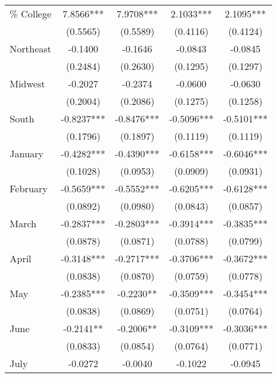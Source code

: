 \begin{table}[htbp]
\begin{tabular}{l*{4}{c}}
\% College          &      7.8566***&      7.9708***&      2.1033***&      2.1095***\\
                    &    (0.5565)   &    (0.5589)   &    (0.4116)   &    (0.4124)   \\
Northeast           &     -0.1400   &     -0.1646   &     -0.0843   &     -0.0845   \\
                    &    (0.2484)   &    (0.2630)   &    (0.1295)   &    (0.1297)   \\
Midwest             &     -0.2027   &     -0.2374   &     -0.0600   &     -0.0630   \\
                    &    (0.2004)   &    (0.2086)   &    (0.1275)   &    (0.1258)   \\
South               &     -0.8237***&     -0.8476***&     -0.5096***&     -0.5101***\\
                    &    (0.1796)   &    (0.1897)   &    (0.1119)   &    (0.1119)   \\
January             &     -0.4282***&     -0.4390***&     -0.6158***&     -0.6046***\\
                    &    (0.1028)   &    (0.0953)   &    (0.0909)   &    (0.0931)   \\
February            &     -0.5659***&     -0.5552***&     -0.6205***&     -0.6128***\\
                    &    (0.0892)   &    (0.0980)   &    (0.0843)   &    (0.0857)   \\
March               &     -0.2837***&     -0.2803***&     -0.3914***&     -0.3835***\\
                    &    (0.0878)   &    (0.0871)   &    (0.0788)   &    (0.0799)   \\
April               &     -0.3148***&     -0.2717***&     -0.3706***&     -0.3672***\\
                    &    (0.0838)   &    (0.0870)   &    (0.0759)   &    (0.0778)   \\
May                 &     -0.2385***&     -0.2230** &     -0.3509***&     -0.3454***\\
                    &    (0.0838)   &    (0.0869)   &    (0.0751)   &    (0.0764)   \\
June                &     -0.2141** &     -0.2006** &     -0.3109***&     -0.3036***\\
                    &    (0.0833)   &    (0.0854)   &    (0.0764)   &    (0.0771)   \\
July                &     -0.0272   &     -0.0040   &     -0.1022   &     -0.0945   \\

\end{tabular}
\end{table}
